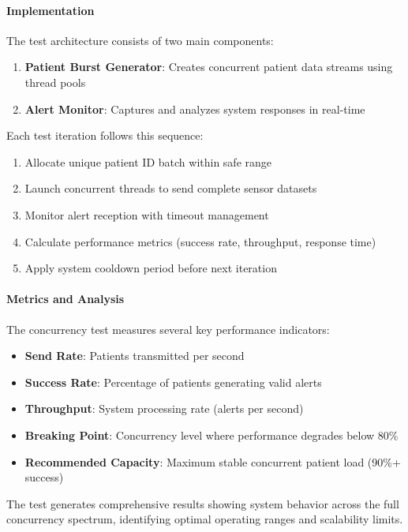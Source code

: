 \paragraph{Implementation}
The test architecture consists of two main components:

\begin{enumerate}
    \item \textbf{Patient Burst Generator}: Creates concurrent patient data streams using thread pools
    \item \textbf{Alert Monitor}: Captures and analyzes system responses in real-time
\end{enumerate}

Each test iteration follows this sequence:
\begin{enumerate}
    \item Allocate unique patient ID batch within safe range
    \item Launch concurrent threads to send complete sensor datasets
    \item Monitor alert reception with timeout management
    \item Calculate performance metrics (success rate, throughput, response time)
    \item Apply system cooldown period before next iteration
\end{enumerate}

\paragraph{Metrics and Analysis}
The concurrency test measures several key performance indicators:

\begin{itemize}
    \item \textbf{Send Rate}: Patients transmitted per second
    \item \textbf{Success Rate}: Percentage of patients generating valid alerts
    \item \textbf{Throughput}: System processing rate (alerts per second)
    \item \textbf{Breaking Point}: Concurrency level where performance degrades below 80\%
    \item \textbf{Recommended Capacity}: Maximum stable concurrent patient load (90\%+ success)
\end{itemize}

The test generates comprehensive results showing system behavior across the full concurrency spectrum, identifying optimal operating ranges and scalability limits.


